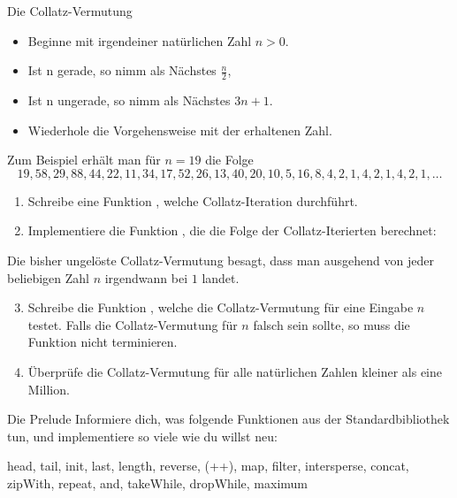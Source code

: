 \documentclass{uebblatt}
\begin{document}
\begin{aufgabe}{Die Collatz-Vermutung}
  \begin{itemize}
    \item Beginne mit irgendeiner natürlichen Zahl $n > 0$.
    \item Ist n gerade, so nimm als Nächstes $\tfrac{n}{2}$,
    \item Ist n ungerade, so nimm als Nächstes $3n + 1$.
    \item Wiederhole die Vorgehensweise mit der erhaltenen Zahl.
  \end{itemize}
  Zum Beispiel erhält man für $n=19$ die Folge
  \[ 19, 58, 29, 88, 44, 22, 11, 34, 17, 52, 26, 13, 40, 20, 10, 5, 16, 8, 4, 2, 1, 4, 2, 1, 4, 2, 1, \ldots \]
  \begin{enumerate}
    
    \item Schreibe eine Funktion , welche Collatz-Iteration durchführt.
    \item Implementiere die Funktion , die die Folge der Collatz-Iterierten berechnet: 
  \end{enumerate}
  Die bisher ungelöste Collatz-Vermutung besagt, dass man ausgehend von jeder beliebigen Zahl $n$ irgendwann bei $1$ landet.
  \begin{enumerate}
    \setcounter{enumi}{2}
    \item Schreibe die Funktion , welche die Collatz-Vermutung für eine Eingabe $n$ testet. Falls die Collatz-Vermutung für $n$ falsch sein sollte, so muss die Funktion nicht terminieren.
    \item Überprüfe die Collatz-Vermutung für alle natürlichen Zahlen kleiner als eine Million.
  \end{enumerate}
\end{aufgabe}

\begin{aufgabe}{Die Prelude}
  Informiere dich, was folgende Funktionen aus der Standardbibliothek tun, und implementiere so viele wie du willst neu:
  \begin{haskellcode}
head, tail, init, last, length, reverse, (++), map, filter, intersperse,
concat, zipWith, repeat, and, takeWhile, dropWhile, maximum
  \end{haskellcode}
\end{aufgabe}
\end{document}
